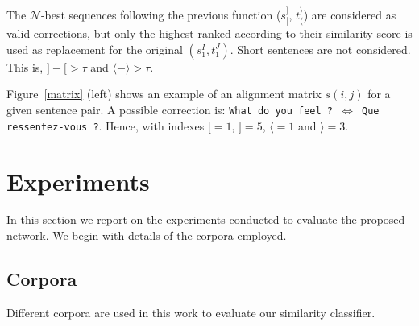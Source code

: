 \documentclass[11pt,a4paper]{article}
\begin{document}
The $\mathcal{N}$-best sequences following the previous function ($s_[^]$, $t_\langle^\rangle$) are considered as valid corrections, but only the highest ranked according to their similarity score is used as replacement for the original $(s_1^I, t_1^J)$. %
Short sentences are not considered. This is, $] - [ > \tau$ and $\langle - \rangle > \tau$. 

Figure~\ref{matrix} (left) shows an example of an alignment matrix $s(i,j)$ for a given sentence pair. A possible correction is: \texttt{What do you feel ? $\Leftrightarrow$ Que ressentez-vous ?}. Hence, with indexes $[=1$, $]=5$, $\langle=1$ and $\rangle=3$.




\section{Experiments}
\label{experiments}

In this section we report on the experiments conducted to evaluate the proposed network. We begin with details of the corpora employed.

\subsection{Corpora}
\label{corpora}

Different corpora are used in this work to evaluate our similarity classifier.
\end{document}
